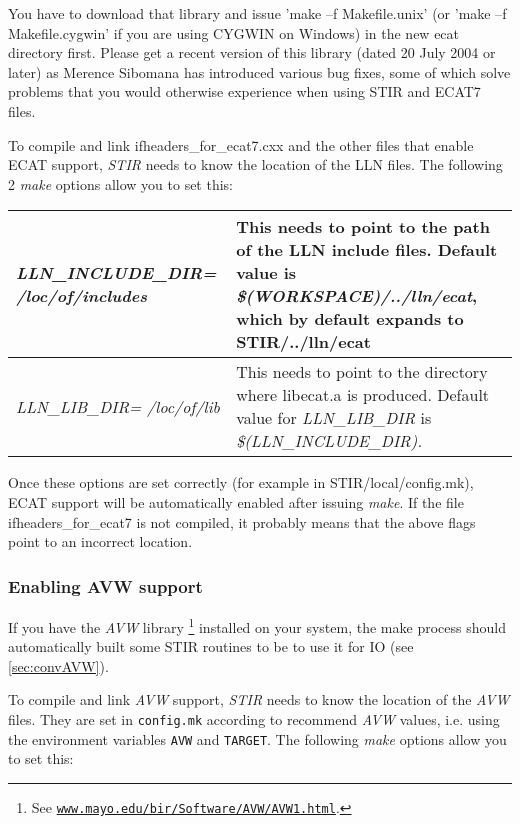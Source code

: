 \documentclass{article}
\def\R2Lurl#1#2{\mbox{\href{#1}{\tt #2}}}
\begin{document}
You have to download that library and issue 'make --f Makefile.unix' 
(or 'make --f Makefile.cygwin' if you are using CYGWIN on Windows) 
in the new ecat directory first. Please get a recent version 
of this library (dated 20 July 2004 or later) as Merence Sibomana 
has introduced various bug fixes, some of which solve problems 
that you would otherwise experience when using STIR and ECAT7 
files.


To compile and link ifheaders\_for\_ecat7.cxx and the other files 
that enable ECAT support, \textit{STIR} needs to know the location 
of the LLN files. The following 2 \textit{make} options allow you 
to set this:



\begin{longtable}{|p{\MakeTableFirstCol}|p{\MakeTableSecondCol}|}
\hline
\raggedright
\textit{LLN\_INCLUDE\_DIR=\linebreak
/loc/of/includes} &
This needs to point to the path of the LLN include files. Default 
value is \textit{\$(WORKSPACE)/../lln/ecat}, which by default expands 
to \textbf{STIR/../lln/ecat}\\
\hline
{\raggedright \textit{LLN\_LIB\_DIR= \linebreak
/loc/of/lib}} & 
{\raggedright This needs to point to the directory where libecat.a is produced. 
Default value for \textit{LLN\_LIB\_DIR} is \textit{\$(LLN\_INCLUDE\_DIR).}} \\
\hline
\end{longtable}


Once these options are set correctly (for example in STIR/local/config.mk), 
ECAT support will be automatically enabled after issuing \textit{make}. 
If the file ifheaders\_for\_ecat7 is not compiled, it probably 
means that the above flags point to an incorrect location.

\subsubsection{
Enabling AVW support}
\label{sec:AVWsupport}
If you have the \textit{AVW}\texttrademark{}  library
\footnote{See \R2Lurl{http://www.mayo.edu/bir/Software/AVW/AVW1.html}
{www.mayo.edu/bir/Software/AVW/AVW1.html}.
} installed on your system, the make process should automatically built
some STIR routines to be to use it for IO (see \ref{sec:convAVW}).

To compile and link \textit{AVW} support, \textit{STIR} needs to know the location 
of the \textit{AVW} files. 
They are set in \texttt{config.mk} according to recommend \textit{AVW} values,
i.e. using the environment variables \texttt{AVW} and \texttt{TARGET}.
The following \textit{make} options allow you 
to set this:
\end{document}
